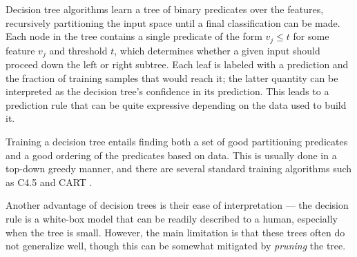 %
%


Decision tree algorithms learn a tree of binary predicates over the
features, recursively partitioning the input space until a final
classification can be made.
%
Each node in the tree contains a single predicate of the form
$v_j \leq t$ for some feature $v_j$ and threshold $t$, which determines
whether a given input should proceed down the left or right subtree.
%
Each leaf is labeled with a prediction and the fraction of training
samples that would reach it; the latter quantity can be interpreted as
the decision tree's confidence in its prediction.
%
This leads to a prediction rule that can be quite expressive depending
on the data used to build it.

Training a decision tree entails finding both a set of good partitioning
predicates and a good ordering of the predicates based on data.
%
This is usually done in a top-down greedy manner, and there are several
standard training algorithms such as C4.5 \citep{Quinlan1993-de} and
CART \citep{Breiman1984-qy}.

Another advantage of decision trees is their ease of interpretation ---
the decision rule is a white-box model that can be readily described to
a human, especially when the tree is small.
%
However, the main limitation is that these trees often do not generalize
well, though this can be somewhat mitigated by \emph{pruning} the tree.


%
%
%

